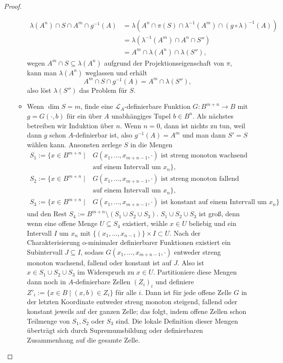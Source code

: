 \documentclass[a4paper, 11pt]{report}
\newcommand{\lingua}{\mathcal{L}}
\theoremstyle{definition}
\begin{document}
\begin{proof}
\begin{itemize}
\begin{itemize}
			\begin{align*}
			\lambda(A^n)\cap S\cap A^m\cap g^{-1}(A)&=\lambda(A^n\cap\pi(S)\cap\lambda^{-1}(A^m)\cap (g\circ\lambda)^{-1}(A))\\
			&=\lambda(\lambda^{-1}(A^m)\cap A^n\cap S'')\\
			&=A^m\cap\lambda(A^n)\cap\lambda(S''),
			\end{align*}
			wegen $A^m\cap S\subseteq\lambda(A^n)$ aufgrund der Projektionseigenschaft von $\pi$, kann man $\lambda(A^n)$ weglassen und erhält $$A^m\cap S\cap g^{-1}(A)=A^m\cap\lambda(S''),$$
			also löst $\lambda(S'')$ das Problem für $S$.
			\newpage
			\item Wenn $\dim S=m$, finde eine $\lingua_A$-definierbare Funktion $G:B^{m+n}\rightarrow B$ mit $g=G(\cdot,b)$ für ein über $A$ unabhängiges Tupel $b\in B^n$. Als nächstes betreiben wir Induktion über $n$. Wenn $n=0$, dann ist nichts zu tun, weil dann $g$ schon $A$-definierbar ist, also $g^{-1}(A)=A^m$ und man dann $S'=S$ wählen kann. Ansonsten zerlege $S$ in die Mengen
			\begin{align*}
			S_1:=\{x\in B^{m+n}\mid&G(x_1,\dots,x_{m+n-1},\cdot)\text{ ist streng monoton wachsend }\\&\text{auf einem Intervall um }x_n\},\\S_2:=\{x\in B^{m+n}\mid&G(x_1,\dots,x_{m+n-1},\cdot)\text{ ist streng monoton fallend }\\&\text{auf einem Intervall um }x_n\},\\S_3:=\{x\in B^{m+n}\mid&G(x_1,\dots,x_{m+n-1},\cdot)\text{ ist konstant auf einem Intervall um }x_n\}
			\end{align*}
			und den Rest $S_4:=B^{m+n}\setminus(S_1\cup S_2\cup S_3)$.
			$S_1\cup S_2\cup S_3$ ist groß, denn wenn eine offene Menge $U\subseteq S_4$ existiert, wähle $x\in U$ beliebig und ein Intervall $I$ um $x_n$ mit $\{(x_1,\dots,x_{n-1})\}\times I\subset U$. Nach der Charakterisierung o-minimaler definierbarer Funktionen existiert ein Subintervall $J\subseteq I$, sodass $G(x_1,\dots,x_{m+n-1},\cdot)$ entweder streng monoton wachsend, fallend oder konstant ist auf $J$. Also ist $x\in S_1\cup S_2\cup S_3$ im Widerspruch zu $x\in U$.
			Partitioniere diese Mengen dann noch in $A$-definierbare Zellen $(Z_i)_i$ und definiere $Z'_i:=\{x\in B\mid (x,b)\in Z_i\}$ für alle $i$. Dann ist für jede offene Zelle $G$ in der letzten Koordinate entweder streng monoton steigend, fallend oder konstant jeweils auf der ganzen Zelle; das folgt, indem offene Zellen schon Teilmenge von $S_1,S_2$ oder $S_3$ sind. Die lokale Definition dieser Mengen überträgt sich durch Supremumsbildung oder definierbaren Zusammenhang auf die gesamte Zelle.\\

\end{itemize}
\end{itemize}
\end{proof}
\end{document}
